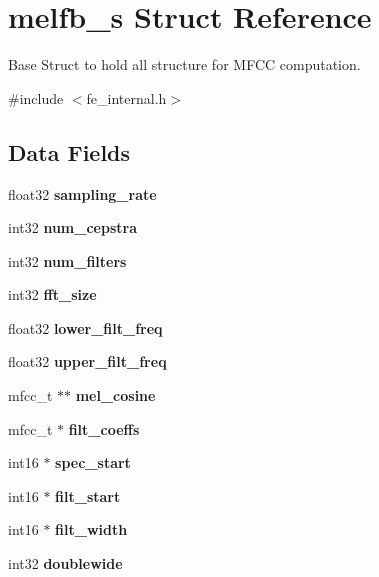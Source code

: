 \section{melfb\+\_\+s Struct Reference}
\label{structmelfb__s}


Base Struct to hold all structure for M\+F\+CC computation.  




{\ttfamily \#include $<$fe\+\_\+internal.\+h$>$}

\subsection*{Data Fields}
\begin{DoxyCompactItemize}
\item 
\mbox{\label{structmelfb__s_a6481b2124bb1c1f2dd17cfaceef34b10}} 
float32 {\bfseries sampling\+\_\+rate}
\item 
\mbox{\label{structmelfb__s_a1f196e53dd4933196b2a3aef1d2597a6}} 
int32 {\bfseries num\+\_\+cepstra}
\item 
\mbox{\label{structmelfb__s_a3cb5379f4a24effa719296edaf484109}} 
int32 {\bfseries num\+\_\+filters}
\item 
\mbox{\label{structmelfb__s_a9af4273d9de3551b7ce782618d9acb3b}} 
int32 {\bfseries fft\+\_\+size}
\item 
\mbox{\label{structmelfb__s_a11a5ccdcbffb5e1cc21909c4af30d494}} 
float32 {\bfseries lower\+\_\+filt\+\_\+freq}
\item 
\mbox{\label{structmelfb__s_ac94388ee3f0ac984a0957fc90eb8bf6c}} 
float32 {\bfseries upper\+\_\+filt\+\_\+freq}
\item 
\mbox{\label{structmelfb__s_a8836cd634ec20bc853d3c70e0c5fb768}} 
mfcc\+\_\+t $\ast$$\ast$ {\bfseries mel\+\_\+cosine}
\item 
\mbox{\label{structmelfb__s_a37da6d455b352696ac8340d1e77c622f}} 
mfcc\+\_\+t $\ast$ {\bfseries filt\+\_\+coeffs}
\item 
\mbox{\label{structmelfb__s_a2586c719e90eb09baadc11add2ba3fbb}} 
int16 $\ast$ {\bfseries spec\+\_\+start}
\item 
\mbox{\label{structmelfb__s_a24cdb5e426b96d0e97720dfad3a70df0}} 
int16 $\ast$ {\bfseries filt\+\_\+start}
\item 
\mbox{\label{structmelfb__s_a43c26968a65602f1dce3c02e155eea39}} 
int16 $\ast$ {\bfseries filt\+\_\+width}
\item 
\mbox{\label{structmelfb__s_a2f1a3b5e9a985a88dd0a0c57c8e8e682}} 
int32 {\bfseries doublewide}
$$
\end{DoxyCompactItemize}
